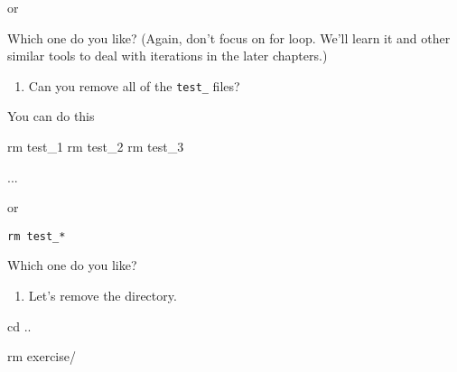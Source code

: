 \documentclass[
]{book}
\newenvironment{Shaded}{\begin{snugshade}}{\end{snugshade}}
\newcommand{\BuiltInTok}[1]{#1}
\newcommand{\ControlFlowTok}[1]{\textcolor[rgb]{0.13,0.29,0.53}{\textbf{#1}}}
\newcommand{\DataTypeTok}[1]{\textcolor[rgb]{0.13,0.29,0.53}{#1}}
\newcommand{\DecValTok}[1]{\textcolor[rgb]{0.00,0.00,0.81}{#1}}
\newcommand{\ExtensionTok}[1]{#1}
\newcommand{\FunctionTok}[1]{\textcolor[rgb]{0.00,0.00,0.00}{#1}}
\newcommand{\KeywordTok}[1]{\textcolor[rgb]{0.13,0.29,0.53}{\textbf{#1}}}
\newcommand{\NormalTok}[1]{#1}
\newcommand{\StringTok}[1]{\textcolor[rgb]{0.31,0.60,0.02}{#1}}
\newcommand{\VariableTok}[1]{\textcolor[rgb]{0.00,0.00,0.00}{#1}}
\providecommand{\tightlist}{%
  \setlength{\itemsep}{0pt}\setlength{\parskip}{0pt}}
\begin{document}
or

\begin{Shaded}
\end{Shaded}

Which one do you like? (Again, don't focus on for loop. We'll learn it and other similar tools to deal with iterations in the later chapters.)

\begin{enumerate}
\def\labelenumi{\arabic{enumi}.}
\setcounter{enumi}{2}
\tightlist
\item
  Can you remove all of the \texttt{test\_} files?
\end{enumerate}

You can do this

\begin{Shaded}
\begin{Highlighting}[]
\FunctionTok{rm}\NormalTok{ test\_1}
\FunctionTok{rm}\NormalTok{ test\_2}
\FunctionTok{rm}\NormalTok{ test\_3 }

\ExtensionTok{...}
\end{Highlighting}
\end{Shaded}

or

\begin{verbatim}
rm test_*
\end{verbatim}

Which one do you like?

\begin{enumerate}
\def\labelenumi{\arabic{enumi}.}
\setcounter{enumi}{3}
\tightlist
\item
  Let's remove the directory.
\end{enumerate}

\begin{Shaded}
\begin{Highlighting}[]

\BuiltInTok{cd}\NormalTok{ .. }

\FunctionTok{rm}\NormalTok{ exercise/}
\end{Highlighting}
\end{Shaded}
\end{document}
